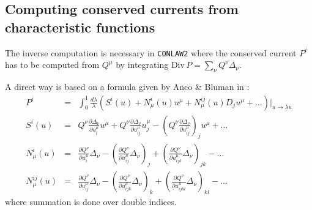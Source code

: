 \subsection{Computing conserved currents from \\
            characteristic functions}
The inverse computation is necessary in {\tt CONLAW2} where the
conserved current $P^i$ has to be computed from $Q^{\mu}$ by
integrating $\mbox{Div}\,P = \sum_{\nu} Q^{\nu} \Delta_{\nu}$.

A direct way is based on a formula %
given by Anco \& Bluman in \cite{AB}:
\begin{eqnarray}
P^i & = & \int^1_0 \frac{d \lambda}{\lambda}
       \left(S^i(u) + N^i_{\mu}(u)u^{\mu} + N^{ij}_{\mu}(u)D_ju^{\mu}
        + \ldots\right)|_{u\rightarrow \lambda u}  \label{ab0} \\
S^i(u) & = & Q^{\nu}\frac{\partial \Delta_{\nu}}{\partial u^{\mu}_i}u^{\mu} +
          Q^{\nu}\frac{\partial \Delta_{\nu}}{\partial u^{\mu}_{ij}}u^{\mu}_j -
          \left(Q^{\nu}\frac{\partial \Delta_{\nu}}{\partial
                                  u^{\mu}_{ij}}\right)_{j}u^{\mu} + \ldots
         \label{ab1} \\
N^i_{\mu}(u) & = & \frac{\partial Q^{\nu}}{\partial u^{\mu}_i}\Delta_{\nu} -
          \left(\frac{\partial Q^{\nu}}{\partial u^{\mu}_{ij}}\Delta_{\nu}\right)_{j} +
          \left(\frac{\partial Q^{\nu}}{\partial u^{\mu}_{ijk}}\Delta_{\nu}\right)_{jk} - \ldots   \label{ab2} \\
N^{ij}_{\mu}(u) & = & \frac{\partial Q^{\nu}}{\partial u^{\mu}_{ij}}\Delta_{\nu} -
          \left(\frac{\partial Q^{\nu}}{\partial u^{\mu}_{ijk}}\Delta_{\nu}\right)_{k} +
          \left(\frac{\partial Q^{\nu}}{\partial u^{\mu}_{ijkl}}\Delta_{\nu}\right)_{kl} - \ldots  \label{ab3}
\end{eqnarray}
where summation is done over double indices.

